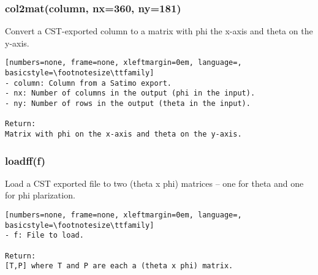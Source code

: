 \subsubsection{col2mat(column, nx=360, ny=181)}
Convert a CST-exported column to a matrix with phi the 
x-axis and theta on the y-axis.

\begin{lstlisting}[numbers=none, frame=none, xleftmargin=0em, language=, basicstyle=\footnotesize\ttfamily]
- column: Column from a Satimo export.
- nx: Number of columns in the output (phi in the input).
- ny: Number of rows in the output (theta in the input).

Return:
Matrix with phi on the x-axis and theta on the y-axis.
\end{lstlisting}

\subsubsection{loadff(f)}
Load a CST exported file to two (theta x phi) matrices -- one for theta and
one for phi plarization.

\begin{lstlisting}[numbers=none, frame=none, xleftmargin=0em, language=, basicstyle=\footnotesize\ttfamily]
- f: File to load.

Return:
[T,P] where T and P are each a (theta x phi) matrix.
\end{lstlisting}

